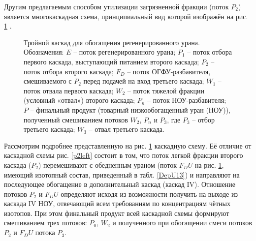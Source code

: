 Другим предлагаемым способом утилизации загрязненной фракции (поток $P_2$) является многокаскадная схема, принципиальный вид которой изображён на рис. \ref{p2_withDepU} \cite{smirnovApplyingEnrichmentCapacities2018}.

\begin{figure}[ht]
    \caption{Тройной каскад для обогащения регенерированного урана. Обозначения: $E$ -- поток регенерированного урана; $P_1$ -- поток отбора первого каскада, выступающий питанием второго каскада; $P_2$ -- поток отбора второго каскада; $F_{D}$ -- поток ОГФУ-разбавителя, смешиваемого с $P_2$ перед подачей на вход третьего каскада; $W_1$ -- поток отвала первого каскада; $W_2$ -- поток тяжелой фракции (условный «отвал») второго каскада; $P_n$ -- поток НОУ-разбавителя; $P$ -- финальный продукт (товарный низкообогащенный уран (НОУ)), полученный смешиванием потоков $W_2$, $P_n$ и $P_3$, где $P_3$ -- отбор третьего каскада; $W_3$ -- отвал третьего каскада.}\label{p2_withDepU}
\end{figure}

Рассмотрим подробнее представленную на рис. \ref{p2_withDepU} каскадную схему. Её отличие от каскадной схемы рис. \ref{p2left} состоит в том, что поток легкой фракции второго каскада ($P_2$) перемешивают с обедненным ураном (поток $F_DU$ на рис. \ref{p2_withDepU}, имеющий изотопный состав, приведенный в табл. \ref{DepU13}) и направляют на последующее обогащение в дополнительный каскад (каскад IV). Отношение потоков $P_2$ и $F_DU$ определяют исходя из возможности получить на выходе из каскада IV НОУ, отвечающий всем требованиям по концентрациям чётных изотопов. При этом финальный продукт всей каскадной схемы формируют смешиванием трех потоков: $P_0$, $W_2$ и полученного при обогащении смеси потоков $P_2$ и $F_DU$ потока $P_3$.

